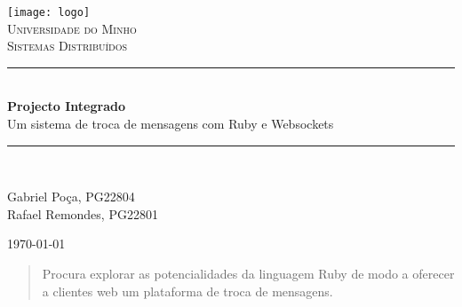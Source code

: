 \documentclass[12pt]{article} %
\begin{document}

\begin{titlepage}

  \newcommand{\HRule}{\rule{\linewidth}{0.5mm}} %

  \center %

  \texttt{[image: logo]}\\[1cm] %

  \textsc{\LARGE Universidade do Minho}\\[1.5cm] %
  \textsc{\Large Sistemas Distribuídos}\\[0.5cm] %

  \HRule \\[0.4cm]
  { \huge \bfseries Projecto Integrado}\\[0.1cm] %
  { \small Um sistema de troca de mensagens com Ruby e Websockets }
  \HRule \\[0.8cm]

  \begin{flushleft}
    Gabriel Poça, PG22804 \\
    Rafael Remondes, PG22801\\
  \end{flushleft}


  {\large \today}\\[3cm] %

  \begin{abstract}
    Procura explorar as potencialidades da linguagem Ruby de modo a oferecer
    a clientes web um plataforma de troca de mensagens.
  \end{abstract}


  \vfill %

\end{titlepage}

\end{document}
